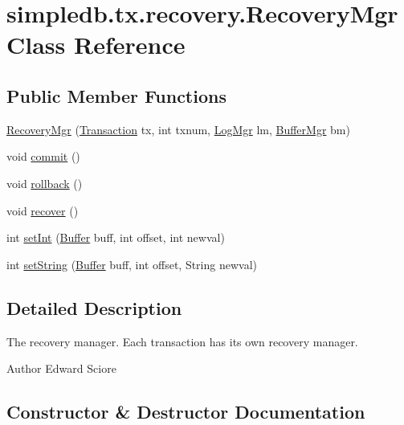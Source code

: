 \hypertarget{classsimpledb_1_1tx_1_1recovery_1_1RecoveryMgr}{}\section{simpledb.\+tx.\+recovery.\+Recovery\+Mgr Class Reference}
\label{classsimpledb_1_1tx_1_1recovery_1_1RecoveryMgr}
\subsection*{Public Member Functions}
\begin{DoxyCompactItemize}
\item 
\hyperlink{classsimpledb_1_1tx_1_1recovery_1_1RecoveryMgr_a208eb59b2bed7b2493e68fc43742f813}{Recovery\+Mgr} (\hyperlink{classsimpledb_1_1tx_1_1Transaction}{Transaction} tx, int txnum, \hyperlink{classsimpledb_1_1log_1_1LogMgr}{Log\+Mgr} lm, \hyperlink{classsimpledb_1_1buffer_1_1BufferMgr}{Buffer\+Mgr} bm)
\item 
void \hyperlink{classsimpledb_1_1tx_1_1recovery_1_1RecoveryMgr_a7aaf21c8afc97f5118943721c58450bb}{commit} ()
\item 
void \hyperlink{classsimpledb_1_1tx_1_1recovery_1_1RecoveryMgr_a4fd081a3a950886ce87ba6987199cfc6}{rollback} ()
\item 
void \hyperlink{classsimpledb_1_1tx_1_1recovery_1_1RecoveryMgr_a5886374d7a898bffcc9c6b05d18c12a1}{recover} ()
\item 
int \hyperlink{classsimpledb_1_1tx_1_1recovery_1_1RecoveryMgr_af89e8dddf6f248ca53b752f2ff038ddb}{set\+Int} (\hyperlink{classsimpledb_1_1buffer_1_1Buffer}{Buffer} buff, int offset, int newval)
\item 
int \hyperlink{classsimpledb_1_1tx_1_1recovery_1_1RecoveryMgr_a732be73a217bb918f3f46f802e189ccf}{set\+String} (\hyperlink{classsimpledb_1_1buffer_1_1Buffer}{Buffer} buff, int offset, String newval)
\end{DoxyCompactItemize}


\subsection{Detailed Description}
The recovery manager. Each transaction has its own recovery manager. \begin{DoxyAuthor}{Author}
Edward Sciore 
\end{DoxyAuthor}


\subsection{Constructor \& Destructor Documentation}
\mbox{\label{classsimpledb_1_1tx_1_1recovery_1_1RecoveryMgr_a208eb59b2bed7b2493e68fc43742f813}} 
